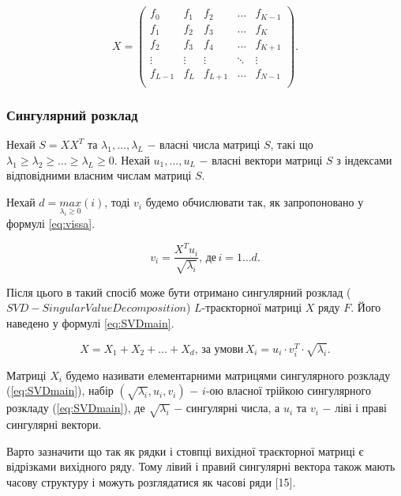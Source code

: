 \begin{equation}\label{eq:traekt}
X = \left(\begin{array}{ccccc} 
f_{0} & f_{1} & f_{2} & \dots & f_{K-1} \\
f_{1} & f_{2} & f_{3} & \dots & f_{K} \\
f_{2} & f_{3} & f_{4} & \dots & f_{K+1} \\
\vdots & \vdots & \vdots & \ddots & \vdots \\
f_{L-1} & f_{L} & f_{L+1} & \dots & f_{N-1} \\
\end{array}\right).
\end{equation}

\subsubsection{Сингулярний розклад}

Нехай $S = XX^{T}$ та $\lambda_{1}, \dots, \lambda_{L}$ $-$ власні числа матриці $S$, такі що $\lambda_{1} \ge \lambda_{2} \ge \dots \ge \lambda_{L} \ge 0$. Нехай $u_{1}, \dots, u_{L}$ $-$ власні вектори матриці $S$ з індексами відповідними власним числам матриці $S$.

Нехай $d = \underset{\lambda_{i} \ge 0}{max}(i)$, тоді $v_{i}$ будемо обчислювати так, як запропоновано у формулі \ref{eq:vissa}.

\begin{equation}\label{eq:vissa}
v_{i} = \frac{X^{T}u_{i}}{\sqrt{\lambda_{i}}}, \, \text{де} \, i=1 \dots d.
\end{equation}

Після цього в такий спосіб може бути отримано сингулярний розклад ($SVD - Singular Value Decomposition$) $L$-траєкторної матриці $X$ ряду $F$. Його наведено у формулі \ref{eq:SVDmain}.

\begin{equation}\label{eq:SVDmain}
X = X_{1} + X_{2} + \dots + X_{d}, \, \text{за умови} \, X_{i} = u_{i} \cdot v_{i}^{T} \cdot \sqrt{\lambda_{i}}.
\end{equation}

Матриці $X_{i}$ будемо називати елементарними матрицями сингулярного розкладу (\ref{eq:SVDmain}), набір $(\sqrt{\lambda_{i}}, u_{i}, v_{i})$ $-$ $i$-ою власної трійкою сингулярного розкладу (\ref{eq:SVDmain}), де $\sqrt{\lambda_{i}}$ $-$ сингулярні числа, а $u_{i}$ та $v_{i}$ $-$ ліві і праві сингулярні вектори.

Варто зазначити що так як рядки і стовпці вихідної траєкторної матриці є відрізками вихідного ряду. Тому лівий і правий сингулярні вектора також мають часову структуру і можуть розглядатися як часові ряди [15].

